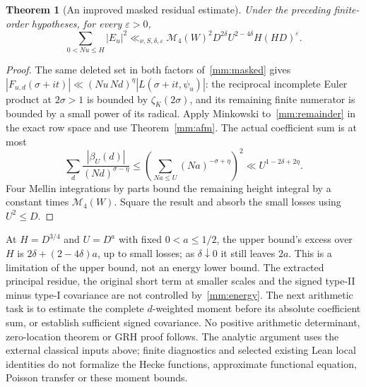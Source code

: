 \documentclass[11pt]{article}
\newtheorem{theorem}{Theorem}[section]
\theoremstyle{definition}\newtheorem{definition}[theorem]{Definition}
\theoremstyle{remark}\newtheorem{remark}[theorem]{Remark}
\begin{document}
\begin{theorem}[An improved masked residual estimate]
\label{mm:residual}
Under the preceding finite-order hypotheses, for every $\varepsilon>0$,
\begin{equation}\label{mm:energy}
 \sum_{0<Nu\le H}|E_u|^2
 \ll_{\nu,S,\delta,\varepsilon}
 \mathcal M_4(W)^2D^{2\delta}U^{2-4\delta}H(HD)^\varepsilon.
\end{equation}
\end{theorem}
\begin{proof}
The same deleted set in both factors of~\eqref{mm:masked} gives
$|F_{u,d}(\sigma+it)|\ll (Nu\,Nd)^\eta|L(\sigma+it,\psi_u)|$:
the reciprocal incomplete Euler product at $2\sigma>1$ is bounded
by $\zeta_K(2\sigma)$, and its remaining finite numerator is bounded
by a small power of its radical. Apply Minkowski to~\eqref{mm:remainder}
in the exact row space and use Theorem~\ref{mm:afm}. The actual coefficient
sum is at most
\[
 \sum_d\frac{|\beta_U(d)|}{(Nd)^{\sigma-\eta}}
 \le\left(\sum_{Na\le U}(Na)^{-\sigma+\eta}\right)^2
 \ll U^{1-2\delta+2\eta}.
\]
Four Mellin integrations by parts bound the remaining height integral
by a constant times $\mathcal M_4(W)$. Square the result and absorb
the small losses using $U^2\le D$.
\end{proof}

At $H=D^{3/4}$ and $U=D^a$ with fixed $0<a\le1/2$, the upper bound's excess
over $H$ is $2\delta+(2-4\delta)a$, up to small losses; as
$\delta\downarrow0$ it still leaves $2a$. This is a limitation of the
upper bound, not an energy lower bound. The extracted principal residue,
the original short term at smaller scales and the signed type-II minus
type-I covariance are not controlled by~\eqref{mm:energy}. The next
arithmetic task is to estimate the complete $d$-weighted moment before
its absolute coefficient sum, or establish sufficient signed covariance.
No positive arithmetic determinant, zero-location theorem or GRH proof
follows. The analytic argument uses the external classical inputs above;
finite diagnostics and selected existing Lean local identities do not
formalize the Hecke functions, approximate functional equation, Poisson
transfer or these moment bounds.
\end{document}
